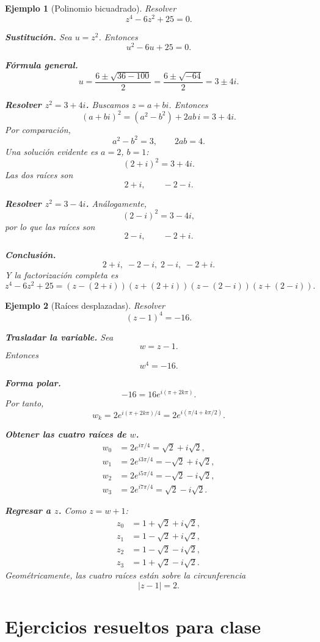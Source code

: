 \documentclass[12pt]{article}
\newtheorem{ejemplo}{Ejemplo}[section]
\begin{document}
\begin{ejemplo}[Polinomio bicuadrado]
Resolver
\[
z^4-6z^2+25=0.
\]

\textbf{Sustitución.}
Sea $u=z^2$. Entonces
\[
u^2-6u+25=0.
\]

\textbf{Fórmula general.}
\[
u=\frac{6\pm\sqrt{36-100}}{2}
=\frac{6\pm\sqrt{-64}}{2}
=3\pm4i.
\]

\textbf{Resolver $z^2=3+4i$.}
Buscamos $z=a+bi$. Entonces
\[
(a+bi)^2=(a^2-b^2)+2ab\,i=3+4i.
\]
Por comparación,
\[
a^2-b^2=3,\qquad 2ab=4.
\]
Una solución evidente es $a=2$, $b=1$:
\[
(2+i)^2=3+4i.
\]
Las dos raíces son
\[
2+i,\qquad -2-i.
\]

\textbf{Resolver $z^2=3-4i$.}
Análogamente,
\[
(2-i)^2=3-4i,
\]
por lo que las raíces son
\[
2-i,\qquad -2+i.
\]

\textbf{Conclusión.}
\[
\boxed{2+i,\;-2-i,\;2-i,\;-2+i.}
\]
Y la factorización completa es
\[
\boxed{
z^4-6z^2+25=
(z-(2+i))(z+(2+i))(z-(2-i))(z+(2-i)).
}
\]
\end{ejemplo}

\begin{ejemplo}[Raíces desplazadas]
Resolver
\[
(z-1)^4=-16.
\]

\textbf{Trasladar la variable.}
Sea
\[
w=z-1.
\]
Entonces
\[
w^4=-16.
\]

\textbf{Forma polar.}
\[
-16=16e^{i(\pi+2k\pi)}.
\]
Por tanto,
\[
w_k=2e^{i(\pi+2k\pi)/4}
=2e^{i(\pi/4+k\pi/2)}.
\]

\textbf{Obtener las cuatro raíces de $w$.}
\[
\begin{aligned}
w_0&=2e^{i\pi/4}=\sqrt2+i\sqrt2,\\
w_1&=2e^{i3\pi/4}=-\sqrt2+i\sqrt2,\\
w_2&=2e^{i5\pi/4}=-\sqrt2-i\sqrt2,\\
w_3&=2e^{i7\pi/4}=\sqrt2-i\sqrt2.
\end{aligned}
\]

\textbf{Regresar a $z$.}
Como $z=w+1$:
\[
\boxed{
\begin{aligned}
z_0&=1+\sqrt2+i\sqrt2,\\
z_1&=1-\sqrt2+i\sqrt2,\\
z_2&=1-\sqrt2-i\sqrt2,\\
z_3&=1+\sqrt2-i\sqrt2.
\end{aligned}}
\]
Geométricamente, las cuatro raíces están sobre la circunferencia
\[
|z-1|=2.
\]
\end{ejemplo}
\section*{Ejercicios resueltos para clase}
\end{document}
